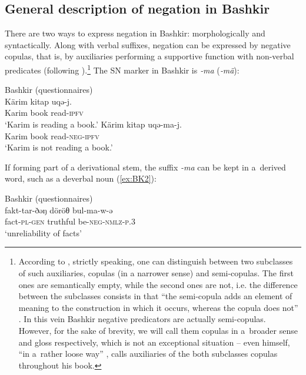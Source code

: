 \documentclass[output=paper]{langsci/langscibook}
\begin{document}
\subsection{General description of negation in Bashkir}\label{sec:BK2.1}

There are two ways to express negation in Bashkir: morphologically and syntactically. Along with verbal suffixes, negation can be expressed by negative copulas, that is, by auxiliaries performing a supportive function with non-verbal predicates (following \citealp{hengeveld1992}).\footnote{According to \citeauthor{hengeveld1992}, strictly speaking, one can distinguish between two subclasses of such auxiliaries, copulas (in a narrower sense) and semi-copulas. The first ones are semantically empty, while the second ones are not, i.e. the difference between the subclasses consists in that “the semi-copula adds an element of meaning to the construction in which it occurs, whereas the copula does not” \citeyearpar[35]{hengeveld1992}. In this vein Bashkir negative predicators are actually semi-copulas. However, for the sake of brevity, we will call them copulas in a broader sense and gloss respectively, which is not an exceptional situation – even \citeauthor{hengeveld1992} himself, “in a rather loose way” \citeyearpar[32]{hengeveld1992}, calls auxiliaries of the both subclasses copulas throughout his book.} The SN marker in Bashkir is \textit{‑ma} (\textit{‑mä}):

\ea Bashkir (questionnaires)\footnotemark \label{ex:BK1}\\
  \ea
	\gll Kärim	kitap	uqə-j.\\
	Karim		book	read-\textsc{ipfv}\\
	\glt `Karim is reading a book.'
  \ex
	\gll Kärim	kitap	uqə-ma-j.\\
	Karim		book	read-\textsc{neg-ipfv}\\
	\glt `Karim is not reading a book.'
\z \z


If forming part of a derivational stem, the suffix \textit{-ma} can be kept in a derived word, such as a deverbal noun (\ref{ex:BK2}):

\ea Bashkir (questionnaires) \label{ex:BK2}\\
	\gll fakt-tar-ðəŋ	döröθ	bul-ma-w-ə\\
	fact-\textsc{pl-gen}	truthful	be-\textsc{neg-nmlz-p.3}\\
	\glt `unreliability of facts'
\z
\end{document}

